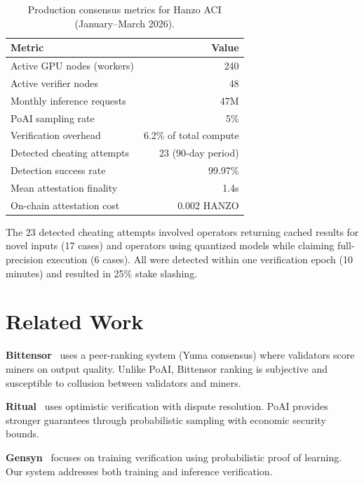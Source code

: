 \documentclass[11pt]{article}
\begin{document}
\begin{table}[H]
\centering
\small
\begin{tabular}{lr}
\toprule
\textbf{Metric} & \textbf{Value} \\
\midrule
Active GPU nodes (workers) & 240 \\
Active verifier nodes & 48 \\
Monthly inference requests & 47M \\
PoAI sampling rate & 5\% \\
Verification overhead & 6.2\% of total compute \\
Detected cheating attempts & 23 (90-day period) \\
Detection success rate & 99.97\% \\
Mean attestation finality & 1.4s \\
On-chain attestation cost & 0.002 HANZO \\
\bottomrule
\end{tabular}
\caption{Production consensus metrics for Hanzo ACI (January--March 2026).}
\label{tab:production}
\end{table}

The 23 detected cheating attempts involved operators returning cached results
for novel inputs (17 cases) and operators using quantized models while claiming
full-precision execution (6 cases). All were detected within one verification
epoch (10 minutes) and resulted in 25\% stake slashing.

\section{Related Work}
\label{sec:related}

\textbf{Bittensor}~\cite{bittensor} uses a peer-ranking system (Yuma consensus)
where validators score miners on output quality. Unlike PoAI, Bittensor ranking
is subjective and susceptible to collusion between validators and miners.

\textbf{Ritual}~\cite{ritual} uses optimistic verification with dispute
resolution. PoAI provides stronger guarantees through probabilistic sampling
with economic security bounds.

\textbf{Gensyn}~\cite{gensyn} focuses on training verification using
probabilistic proof of learning. Our system addresses both training and
inference verification.
\end{document}
